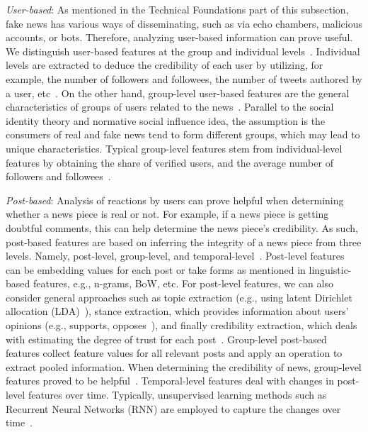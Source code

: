 \begin{description}
    \item{\emph{User-based}:} As mentioned in the Technical Foundations part of this subsection, fake news has various ways of disseminating, such as via echo chambers, malicious accounts, or bots. Therefore, analyzing user-based information can prove useful. We distinguish user-based features at the group and individual levels~\parencite{FakeNewsDetectionOnSocialMediaADataMiningPerspective_Shu}. Individual levels are extracted to deduce the credibility of each user by utilizing, for example, the number of followers and followees, the number of tweets authored by a user, etc~\parencite{InformationCredibilityOnTwiter_Castillo}. On the other hand, group-level user-based features are the general characteristics of groups of users related to the news~\parencite{AutomaticDetectionOfRumor_Yang}. Parallel to the social identity theory and normative social influence idea, the assumption is the consumers of real and fake news tend to form different groups, which may lead to unique characteristics. Typical group-level features stem from individual-level features by obtaining the share of verified users, and the average number of followers and followees~\parencite{DetectRumorsUsingTimeSeries_Ma}.
    \item{\emph{Post-based}:} Analysis of reactions by users can prove helpful when determining whether a news piece is real or not. For example, if a news piece is getting doubtful comments, this can help determine the news piece’s credibility. As such, post-based features are based on inferring the integrity of a news piece from three levels. Namely, post-level, group-level, and temporal-level~\parencite{FakeNewsDetectionOnSocialMediaADataMiningPerspective_Shu}. Post-level features can be embedding values for each post or take forms as mentioned in linguistic-based features, e.g., n-grams, BoW, etc. For post-level features, we can also consider general approaches such as topic extraction (e.g., using latent Dirichlet allocation (LDA)~\parencite{LatentDirichletAllocation_Blei}), stance extraction, which provides information about users’ opinions (e.g., supports, opposes~\parencite{NewsVerificationByExploitingConflictingSocialViewpoints_Jin}), and finally credibility extraction, which deals with estimating the degree of trust for each post~\parencite{InformationCredibilityOnTwiter_Castillo}. Group-level post-based features collect feature values for all relevant posts and apply an operation to extract pooled information. When determining the credibility of news, group-level features proved to be helpful~\parencite{NewsVerificationByExploitingConflictingSocialViewpoints_Jin}. Temporal-level features deal with changes in post-level features over time. Typically, unsupervised learning methods such as Recurrent Neural Networks (RNN) are employed to capture the changes over time~\parencite{DetectingRumorsFromMicroblogs_Ma}.

\end{description}

